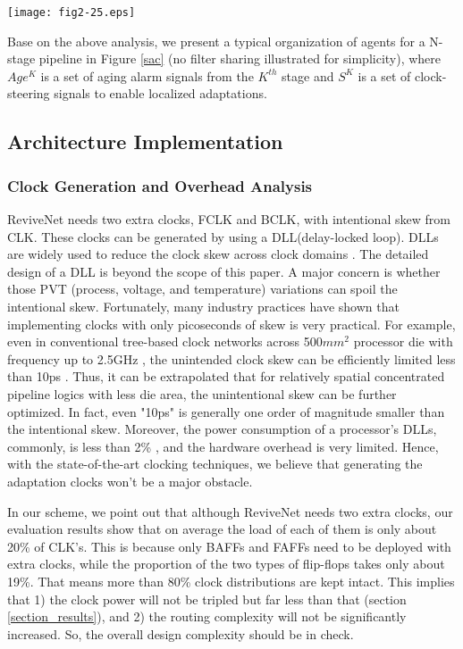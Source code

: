 \begin{figure*}[t]
\centering
\texttt{[image: fig2-25.eps]}%
\vspace{-0.2cm}
   \caption{A group of synergistic agents for a n-stage pipeline}\label{sac}
\end{figure*}


Base on the above analysis, we present a typical organization of agents for a N-stage pipeline in Figure \ref{sac} (no filter sharing illustrated for simplicity), where $Age^K$ is a set of aging alarm signals from the $K^{th}$ stage and $S^K$ is a set of clock-steering signals to enable localized adaptations.

\subsection{Architecture Implementation}\label{imple_issue}

\subsubsection{Clock Generation and Overhead Analysis}\label{section_clcokgen}

ReviveNet needs two extra clocks, FCLK and BCLK, with intentional skew from CLK. These clocks can be generated by using a DLL(delay-locked loop). DLLs are widely used to reduce the clock skew across clock domains \cite{clock_01} \cite{DLL_00} \cite{DLL2_04}. The detailed design of a DLL is beyond the scope of this paper. A major concern is whether those PVT (process, voltage, and temperature) variations can spoil the intentional skew. Fortunately, many industry practices have shown that implementing clocks with only picoseconds of skew is very practical. For example, even in conventional tree-based clock networks across 500$mm^2$ processor die with frequency up to 2.5GHz , the unintended clock skew can be efficiently limited less than 10ps \cite{Itanium_clock05}. Thus, it can be extrapolated that for relatively spatial concentrated pipeline logics with less die area, the unintentional skew can be further optimized. In fact, even "10ps" is generally one order of magnitude smaller than the intentional skew. Moreover, the power consumption of a processor's DLLs, commonly, is less than 2\% \cite{clockpower_02}, and the hardware overhead is very limited. Hence, with the state-of-the-art clocking techniques, we believe that generating the adaptation clocks won't be a major obstacle.

In our scheme, we point out that although ReviveNet needs two extra clocks, our evaluation results show that on average the load of each of them is only about 20\% of CLK's. This is because only BAFFs and FAFFs need to be deployed with extra clocks, while the proportion of the two types of flip-flops takes only about 19\%. That means more than 80\% clock distributions are kept intact. This implies that 1) the clock power will not be tripled  but far less than that (section \ref{section_results}), and 2) the routing complexity will not be significantly increased. So, the overall design complexity should be in check.

